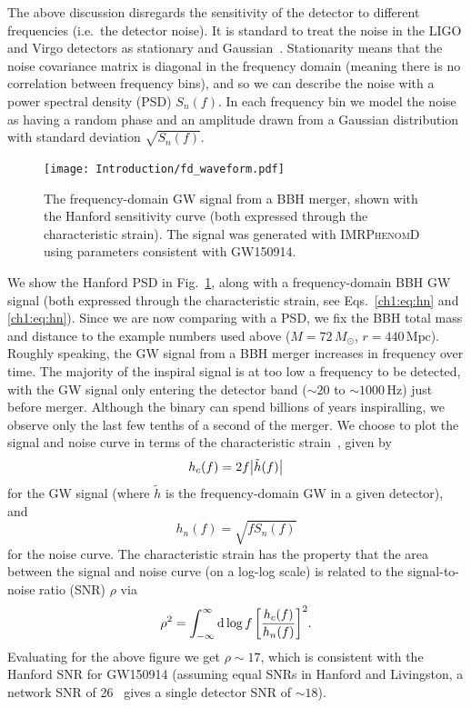 The above discussion disregards the sensitivity of the detector to different frequencies (i.e.\ the detector noise).
It is standard to treat the noise in the LIGO and Virgo detectors as stationary and Gaussian~\cite{LIGOScientific:2019hgc}.
Stationarity means that the noise covariance matrix is diagonal in the frequency domain (meaning there is no correlation between frequency bins), and so we can describe the noise with a power spectral density (PSD) $S_n(f)$.
In each frequency bin we model the noise as having a random phase and an amplitude drawn from a Gaussian distribution with standard deviation $\sqrt{S_n(f)}$.
\begin{figure}
    \centering
    \texttt{[image: Introduction/fd\_waveform.pdf]}
    \caption[Frequency-domain gravitational-wave signal from a binary black-hole merger]{ 
    The frequency-domain GW signal from a BBH merger, shown with the Hanford sensitivity curve (both expressed through the characteristic strain). 
    The signal was generated with \textsc{IMRPhenomD} using parameters consistent with GW150914.
    }
    \label{ch1:fig:fd_waveform}
\end{figure}
We show the Hanford PSD in Fig.~\ref{ch1:fig:fd_waveform}, along with a frequency-domain BBH GW signal (both expressed through the characteristic strain, see Eqs.~\ref{ch1:eq:hn} and \ref{ch1:eq:hn}).
Since we are now comparing with a PSD, we fix the BBH total mass and distance to the example numbers used above ($M = 72\,M_\odot$, $r = 440\,\mathrm{Mpc}$).
Roughly speaking, the GW signal from a BBH merger increases in frequency over time.
The majority of the inspiral signal is at too low a frequency to be detected, with the GW signal only entering the detector band ($\sim 20$ to $\sim 1000\,\mathrm{Hz}$) just before merger.
Although the binary can spend billions of years inspiralling, we observe only the last few tenths of a second of the merger.
We choose to plot the signal and noise curve in terms of the characteristic strain~\cite{Moore:2014lga}, given by
\begin{equation}\label{ch1:eq:hc}
    h_c(f) = 2f\abs{\tilde{h}(f)}
\end{equation}
for the GW signal (where $\tilde{h}$ is the frequency-domain GW in a given detector), and
\begin{equation}\label{ch1:eq:hn}
    h_n(f) = \sqrt{fS_n(f)}
\end{equation}
for the noise curve.
The characteristic strain has the property that the area between the signal and noise curve (on a log-log scale) is related to the signal-to-noise ratio (SNR) $\rho$ via
\begin{equation}
    \rho^2 = \int_{-\infty}^\infty \dd{\log{f}} \qty[\frac{h_c(f)}{h_n(f)}]^2.
\end{equation}
Evaluating for the above figure we get $\rho \sim 17$, which is consistent with the Hanford SNR for GW150914 (assuming equal SNRs in Hanford and Livingston, a network SNR of 26~\cite{LIGOScientific:2021usb} gives a single detector SNR of $\sim 18$).

